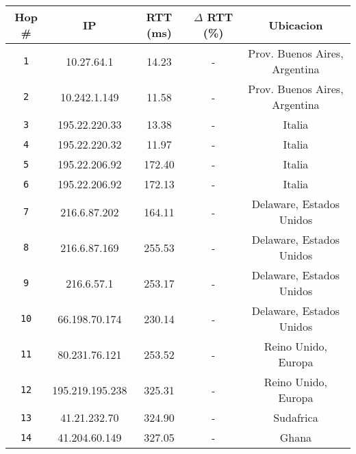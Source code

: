 \begin{table}[ht]\begin{center}
    \begin{tabular}{|c|c|c|c|c|}
    \hline
    \textbf{Hop \#} & \textbf{IP} & \textbf{RTT (ms)} & \textbf{$\Delta$ RTT (\%)} & \textbf{Ubicacion}             \\ \hline
    \texttt{1}  & 10.27.64.1      & 14.23             & -                          & Prov. Buenos Aires, Argentina  \\ \hline
    \texttt{2}  & 10.242.1.149    & 11.58             & -                          & Prov. Buenos Aires, Argentina  \\ \hline
    \texttt{3}  & 195.22.220.33   & 13.38             & -                          & Italia                         \\ \hline
    \texttt{4}  & 195.22.220.32   & 11.97             & -                          & Italia                         \\ \hline
    \texttt{5}  & 195.22.206.92   & 172.40            & -                          & Italia                         \\ \hline
    \texttt{6}  & 195.22.206.92   & 172.13            & -                          & Italia                         \\ \hline
    \texttt{7}  & 216.6.87.202    & 164.11            & -                          & Delaware, Estados Unidos       \\ \hline
    \texttt{8}  & 216.6.87.169    & 255.53            & -                          & Delaware, Estados Unidos       \\ \hline
    \texttt{9}  & 216.6.57.1      & 253.17            & -                          & Delaware, Estados Unidos       \\ \hline
    \texttt{10} & 66.198.70.174   & 230.14            & -                          & Delaware, Estados Unidos       \\ \hline
    \texttt{11} & 80.231.76.121   & 253.52            & -                          & Reino Unido, Europa            \\ \hline
    \texttt{12} & 195.219.195.238 & 325.31            & -                          & Reino Unido, Europa            \\ \hline
    \texttt{13} & 41.21.232.70    & 324.90            & -                          & Sudafrica                      \\ \hline
    \texttt{14} & 41.204.60.149   & 327.05            & -                          & Ghana                          \\ \hline

\end{tabular}
\end{center}
\end{table}
